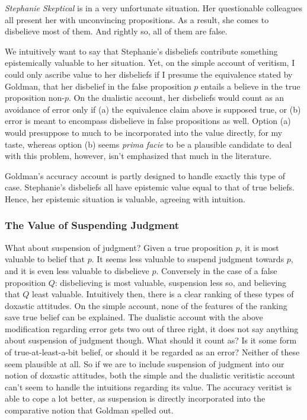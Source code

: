 \documentclass[12pt,numbers=noenddot]{scrartcl}
\begin{document}
\begin{description}
   \item \emph{Stephanie Skeptical} is in a very unfortunate situation. Her questionable colleagues all present her with unconvincing propositions. As a result, she comes to disbelieve most of them. And rightly so, all of them are false.
\end{description}

We intuitively want to say that Stephanie's disbeliefs contribute something epistemically valuable to her situation. Yet, on the simple account of veritism, I could only ascribe value to her disbeliefs if I presume the equivalence stated by Goldman, that her disbelief in the false proposition $p$ entails a believe in the true proposition non-$p$. On the dualistic account, her disbeliefs would count as an avoidance of error only if (a) the equivalence claim above is supposed true, or (b) error is meant to encompass disbelieve in false propositions as well. Option (a) would presuppose to much to be incorporated into the value directly, for my taste, whereas option (b) seems \emph{prima facie} to be a plausible candidate to deal with this problem, however, isn't emphasized that much in the literature.

Goldman's accuracy account is partly designed to handle exactly this type of case. Stephanie's disbeliefs all have epistemic value equal to that of true beliefs. Hence, her epistemic situation is valuable, agreeing with intuition.

\subsubsection{The Value of Suspending Judgment}

What about suspension of judgment? Given a true proposition $p$, it is most valuable to belief that $p$. It seems less valuable to suspend judgment towards $p$, and it is even less valuable to disbelieve $p$. Conversely in the case of a false proposition $Q$: disbelieving is most valuable, suspension less so, and believing that $Q$ least valuable. Intuitively then, there is a clear ranking of these types of doxastic attitudes. On the simple account, none of the features of the ranking save true belief can be explained. The dualistic account with the above modification regarding error gets two out of three right, it does not say anything about suspension of judgment though. What should it count as? Is it some form of true-at-least-a-bit belief, or should it be regarded as an error? Neither of these seem plausible at all. So if we are to include suspension of judgment into our notion of doxastic attitudes, both the simple and the dualistic veritistic account can't seem to handle the intuitions regarding its value. The accuracy veritist is able to cope a lot better, as suspension is directly incorporated into the comparative notion that Goldman spelled out.
\end{document}
